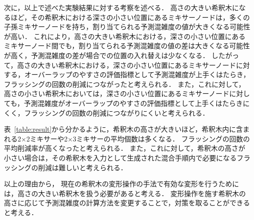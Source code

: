 
次に，以上で述べた実験結果に対する考察を述べる．
高さの大きい希釈木になるほど，その希釈木における深さの小さい位置にあるミキサーノードは，多くの子孫ミキサーノードを持ち，割り当てられる予測混雑度の値が大きくなる可能性が高い．
これにより，高さの大きい希釈木における，深さの小さい位置にあるミキサーノード間でも，割り当てられる予測混雑度の値の差は大きくなる可能性が高く，予測混雑度の差が場合での位置の入れ替えは少なくなる．
したがって，高さの大きい希釈木における，深さの小さい位置にあるミキサーノードに対する，オーバーラップのやすさの評価指標として予測混雑度が上手くはたらき，フラッシングの回数の削減につながったと考えられる．
また，これに対して，高さの小さい希釈木においては，深さの小さい位置にあるミキサーノードに対しても，予測混雑度がオーバーラップのやすさの評価指標として上手くはたらきにくく，フラッシングの回数の削減につながりにくいと考えられる．

表~\ref{table:result}から分かるように，希釈木の高さが大きいほど，希釈木内に含まれる2$\times$2ミキサーや2$\times$3ミキサーの平均個数は多くなる．
フラッシングの回数の平均削減率が高くなったと考えられる．
また，これに対して，希釈木の高さが小さい場合は，その希釈木を入力として生成された混合手順内で必要になるフラッシングの削減は難しいと考えられる．


以上の理由から，
現在の希釈木の変形操作の手法で有効な変形を行うためには，高さの大きい希釈木を扱う必要があると考える．
変形操作を施す希釈木の高さに応じて予測混雑度の計算方法を変更することで，対策を取ることができると考える．

